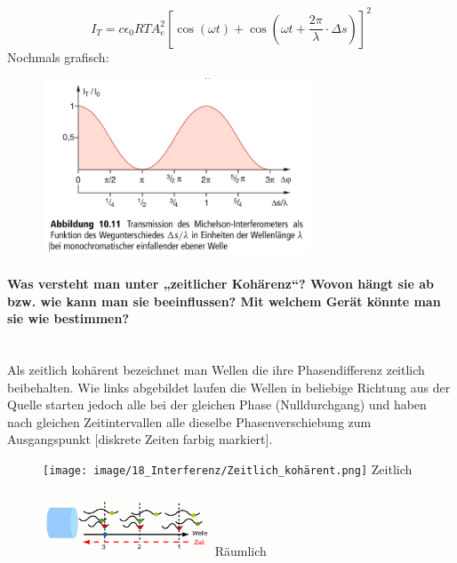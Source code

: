 \documentclass[a4paper, 11pt, ngerman, parskip=half-]{scrartcl}
\newcommand{\myparagraph}[1]{\paragraph{#1}\mbox{}\\}
\begin{document}
\begin{equation}
    I_T = c \epsilon_0 RT A_e^2[\cos(\omega t) + \cos(\omega t + \frac{2\pi}{\lambda}\cdot \Delta s)]^2
\end{equation}
Nochmals grafisch:
\begin{figure}[H]
    \centering
    \includegraphics[width=8cm]{image/18_Interferenz/Michelson_Funktion_Wegunterschied.png}
\end{figure}

\myparagraph{Was versteht man unter „zeitlicher Kohärenz“? Wovon hängt sie ab bzw. wie kann man sie
    beeinflussen? Mit welchem Gerät könnte man sie wie bestimmen?}

Als \glqq zeitlich kohärent \grqq bezeichnet man Wellen die ihre Phasendifferenz zeitlich beibehalten. Wie links abgebildet laufen die Wellen in beliebige Richtung aus der Quelle
starten jedoch alle bei der gleichen Phase (Nulldurchgang) und haben nach gleichen Zeitintervallen alle dieselbe Phasenverschiebung zum Ausgangspunkt [diskrete Zeiten farbig markiert].
\begin{figure}[H]
    \centering
    \begin{minipage}[b]{0.3\textwidth}
        \centering
        \texttt{[image: image/18\_Interferenz/Zeitlich\_kohärent.png]}
        Zeitlich
    \end{minipage}
    \hspace{2cm}
    \begin{minipage}[b]{0.3\textwidth}
        \centering
        \includegraphics[width=5cm]{image/18_Interferenz/räumliche_kohärenz.png}
        Räumlich
    \end{minipage}
\end{figure}
\end{document}
